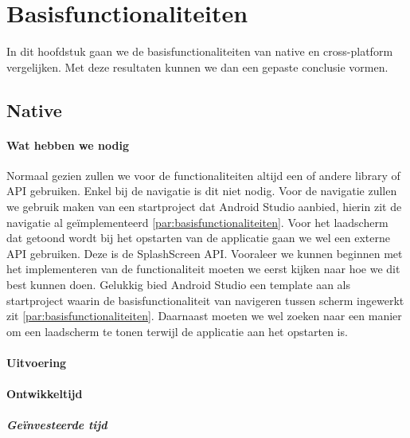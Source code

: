 
\chapter{Basisfunctionaliteiten}%
\label{ch:basisfunctionaliteiten}

In dit hoofdstuk gaan we de basisfunctionaliteiten van native en cross-platform vergelijken. 
Met deze resultaten kunnen we dan een gepaste conclusie vormen.

\section{Native}
\subsubsection{Wat hebben we nodig}
Normaal gezien zullen we voor de functionaliteiten altijd een of andere library of API gebruiken. Enkel bij de navigatie is dit niet nodig. 
Voor de navigatie zullen we gebruik maken van een startproject dat Android Studio aanbied, hierin zit de navigatie al geïmplementeerd 
\ref{par:basisfunctionaliteiten}. Voor het laadscherm dat getoond wordt bij het opstarten van de applicatie gaan we wel een externe API gebruiken. 
Deze is de SplashScreen API.
Vooraleer we kunnen beginnen met het implementeren van de functionaliteit moeten we eerst kijken naar hoe we dit best kunnen doen. 
Gelukkig bied Android Studio een template aan als startproject waarin de basisfunctionaliteit van navigeren tussen scherm ingewerkt 
zit \ref{par:basisfunctionaliteiten}. Daarnaast moeten we wel zoeken naar een manier om een laadscherm te tonen terwijl de applicatie 
aan het opstarten is.

\subsubsection{Uitvoering}

\subsubsection{Ontwikkeltijd}

\paragraph{Geïnvesteerde tijd}


